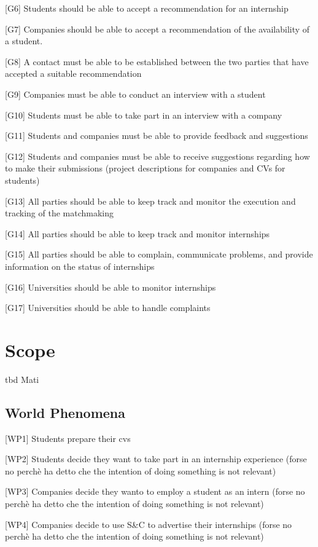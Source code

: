 [G6] Students should be able to accept a recommendation for an internship  

[G7] Companies should be able to accept a recommendation of the availability of a student. 

[G8] A contact must be able to be established between the two parties that have accepted a suitable recommendation  


[G9] Companies must be able to conduct an interview with a student 


[G10] Students must be able to take part in an interview with a company

[G11] Students and companies must be able to provide feedback and suggestions

[G12] Students and companies must be able to receive suggestions regarding how to make their submissions (project descriptions for companies and CVs for students)

[G13] All parties should be able to keep track and monitor the execution and tracking of the matchmaking

[G14] All parties should be able to keep track and monitor internships

[G15] All parties should be able to complain, communicate problems, and provide information on the status of internships

[G16] Universities should be able to monitor internships

[G17] Universities should be able to handle complaints



\section{Scope}
tbd Mati
\subsection{World Phenomena}
[WP1] Students prepare their cvs

[WP2] Students decide they want to take part in an internship experience (forse no perchè ha detto che the intention of doing something is not relevant)

[WP3] Companies decide they wanto to employ a student as an intern (forse no perchè ha detto che the intention of doing something is not relevant)

[WP4] Companies decide to use S\&C to advertise their internships (forse no perchè ha detto che the intention of doing something is not relevant)

